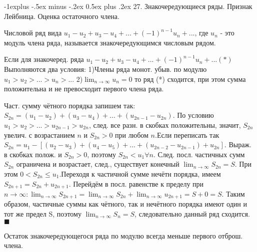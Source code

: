 \documentclass[unicode,10pt, landscape]{article}
\makeatletter
\renewcommand{\subsection}{\@startsection{subsection}{2}{0mm}%
                                {-1explus -.5ex minus -.2ex}%
                                {0.5ex plus .2ex}%
                                {\normalfont\normalsize\bfseries}}
\newenvironment{Proof} %
{\par\noindent{\bf Док-во:}} %
{\hfill$\scriptstyle\blacksquare$}
\makeatother
\begin{document}
\begin{multicols}{4}

 \subsection{27. Знакочередующиеся ряды. Признак Лейбница. Оценка остаточного члена.}
 \begin{Def}
  Числовой ряд вида $u_{1}-u_2+u_3-u_4+...+(-1)^{n-1}u_n+...$, где $u_n$ - это модуль члена ряда, называется знакочередующимся числовым рядом.
 \end{Def}

 \begin{Th}
  Если для знакочеред.  ряда
  $u_{1}-u_2+u_3-u_4+...+(-1)^{n-1}u_n+...(*)$
  Выполняются два условия:
  1)Члены ряда монот. убыв. по модулю $u_{1} > u_2 > ...> u_n > ...$
  2)$\lim_{n \to \infty} u_n = 0$
  то ряд (*) сходится, при этом сумма положительна и не превосходит первого члена ряда.
  \begin{Proof}
   Част. сумму чётного порядка запишем так: $S_{2n}=(u_{1}-u_2)+(u_3-u_4)+...+(u_{2n-1}-u_{2n})$.
   По условию $u_{1} > u_2 > ...> u_{2n-1} > u_{2n}$, след. все разн. в скобках положительны, значит, $S_{2n}$ увелич. с возрастанием $n$  и $ S_{2n}>0$ при любом $n$.Если переписать так $S_{2n}=u_{1}-[(u_2-u_3)+(u_4-u_5)+...+(u_{2n-2}-u_{2n-1})+u_{2n}]$. Выраж. в скобках полож. и  $S_{2n}>0$, поэтому  $S_{2n}<u_1 \forall n$. След. посл. частичных сумм $S_{2n}$ ограничена и возрастает, след., существует конечный  $\lim_{n \to \infty}S_{2n}=S$. При этом $ 0<S_{2n}\leq u_1$.Переходя к частичной сумме нечётн порядка, имеем $S_{2n+1}=S_{2n}+u_{2n+1}$. Перейдём в посл. равенстве к пределу при $n \to \infty:\lim_{n \to \infty}S_{2n+1}=\lim_{n \to \infty}S_{2n}+\lim_{n \to \infty}u_{2n+1}=S+0=S$. Таким образом, частичные суммы как чётного, так и нечётного порядка имеют один и тот же предел S, поэтому $\lim_{n \to \infty}S_{n}=S$, следовательно данный ряд сходится.
  \end{Proof}
 \end{Th}
 Остаток знакочередующегося ряда по модулю всегда меньше первого отброш. члена.



\end{multicols}
\end{document}
